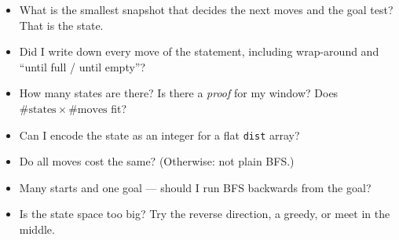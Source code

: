 \begin{checklistbox}
\begin{itemize}[leftmargin=*]
    \item[$\square$] What is the smallest snapshot that decides the next moves and the goal test? That is the state.
    \item[$\square$] Did I write down every move of the statement, including wrap-around and ``until full / until empty''?
    \item[$\square$] How many states are there? Is there a \emph{proof} for my window? Does $\#\text{states}\times\#\text{moves}$ fit?
    \item[$\square$] Can I encode the state as an integer for a flat \texttt{dist} array?
    \item[$\square$] Do all moves cost the same? (Otherwise: not plain BFS.)
    \item[$\square$] Many starts and one goal --- should I run BFS backwards from the goal?
    \item[$\square$] Is the state space too big? Try the reverse direction, a greedy, or meet in the middle.
\end{itemize}
\end{checklistbox}
